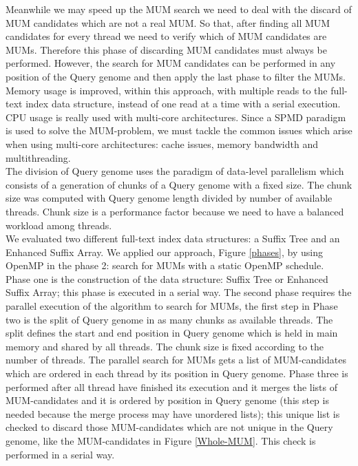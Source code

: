 \documentclass{acm_proc_article-sp}
\begin{document}
Meanwhile we may speed up the MUM search we need to deal with the discard of MUM candidates which are not a real MUM. So that, after finding all MUM candidates for every thread we need to verify which of MUM candidates are MUMs. Therefore this phase of discarding MUM candidates must always be performed. However, the search for MUM candidates can be performed in any position of the Query genome and then apply the last phase to filter the MUMs.\\
 Memory usage is improved, within this approach, with multiple reads to the full-text index data structure, instead of one read at a time with a serial execution. CPU usage is really used with multi-core architectures. Since a SPMD paradigm is used to solve the MUM-problem, we must tackle the common issues which arise when using multi-core architectures: cache issues, memory bandwidth and multithreading.\\
The division of Query genome  uses the paradigm of data-level parallelism which consists of a generation of chunks of a Query genome with a fixed size. The chunk size was computed with Query genome length divided by number of available threads. Chunk size is a performance factor because we need to have a balanced workload among threads.\\
We evaluated two different full-text index data structures: a Suffix Tree and an Enhanced Suffix Array. We applied our approach, Figure \ref{phases}, by using OpenMP in the phase 2: search for MUMs with a static OpenMP schedule.\\
Phase one is the construction of the data structure: Suffix Tree or Enhanced Suffix Array; this phase is executed in a serial way. The second phase requires the parallel execution of the algorithm to search for MUMs, the first step in Phase two is the split of Query genome in as many chunks as available threads. The split defines the start and end position in Query genome which is held in main memory and shared by all threads. The chunk size is fixed according to the number of threads. The parallel search for MUMs gets a list of MUM-candidates which are ordered in each thread by its position in Query genome. Phase three is performed after all thread have finished its execution and it merges the lists of MUM-candidates and it is ordered by position in Query genome (this step is needed because the merge process may have unordered lists); this unique list is checked to discard those MUM-candidates which are not unique in the Query genome, like the MUM-candidates in Figure \ref{Whole-MUM}. This check is performed in a serial way.
\end{document}
